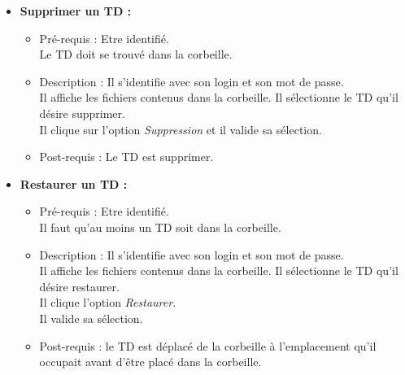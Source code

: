 \begin{itemize}
\item {\bf Supprimer un TD :}
	\begin{itemize}
	\item Pr{\'e}-requis : Etre identifi{\'e}.\\
	Le TD doit se trouv{\'e} dans la corbeille.
	\item Description : Il s'identifie avec son login et son mot de passe.\\
	Il affiche les fichiers contenus dans la corbeille. Il s{\'e}lectionne le TD qu'il d{\'e}sire supprimer.\\
	Il clique sur l'option {\it Suppression} et il valide sa s{\'e}lection.
	\item Post-requis : Le TD est supprimer.\\
	\end{itemize}

\item {\bf Restaurer un TD :}
	\begin{itemize}
	\item Pr{\'e}-requis : Etre identifi{\'e}.\\
	Il faut qu'au moins un TD soit dans la corbeille.
	\item Description : Il s'identifie avec son login et son mot de passe.\\
	Il affiche les fichiers contenus dans la corbeille. Il s{\'e}lectionne le TD qu'il d{\'e}sire restaurer.\\
	Il clique l'option {\it Restaurer}.\\
	Il valide sa s{\'e}lection.
	\item Post-requis : le TD est d{\'e}plac{\'e} de la corbeille {\`a} l'emplacement qu'il occupait avant d'{\^e}tre plac{\'e} dans la corbeille.\\
	\end{itemize}
\end{itemize}


